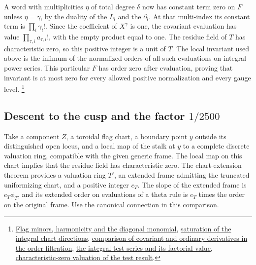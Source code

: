 A word with multiplicities \(\eta\) of total degree \(\delta\) now
has constant term zero on \(F\) unless \(\eta=\gamma\), by the
duality of the \(L_l\) and the \(\partial_l\). At that multi-index
its constant term is \(\prod_l\gamma_l!\). Since the coefficient
of \(X^\gamma\) is one, the covariant evaluation has value
\(\prod_{\tau,i}a_{\tau,i}!\), with the empty product equal to one.
The residue field of \(T\) has characteristic zero, so this positive
integer is a unit of \(T\). The local invariant used above is the
infimum of the normalized orders of all such evaluations on
integral power series. This particular \(F\) has order zero
after evaluation, proving that invariant is at most zero for
every allowed positive normalization and every gauge level.
\footnote{\href{https://github.com/ChristianKudeba/alpoge-rh-verification/blob/alpoge-source-7cbf7a0c/src/Formalism/LocalToGlobal/ProjectiveLattices/CrudeMin.lean}{Flag minors, harmonicity and the diagonal monomial},
\href{https://github.com/ChristianKudeba/alpoge-rh-verification/blob/alpoge-source-7cbf7a0c/src/Formalism/LocalToGlobal/ProjectiveLattices/SatLeaves.lean}{saturation of the integral chart directions},
\href{https://github.com/ChristianKudeba/alpoge-rh-verification/blob/alpoge-source-7cbf7a0c/src/Formalism/LocalToGlobal/ProjectiveLattices/CrudeOrd.lean}{comparison of covariant and ordinary derivatives in the order filtration},
\href{https://github.com/ChristianKudeba/alpoge-rh-verification/blob/alpoge-source-7cbf7a0c/src/Formalism/LocalToGlobal/ProjectiveLattices/ConjNeSelfOfCM.lean}{the integral test series and its factorial value},
\href{https://github.com/ChristianKudeba/alpoge-rh-verification/blob/alpoge-source-7cbf7a0c/src/Development/AbelianVarietyTheory/Proofs/DivisorProofs/ExistsHarmonicPolyLocalInvariantNonposChar0.lean}{characteristic-zero valuation of the test result}.}

\subsection{Descent to the cusp and the factor \(1/2500\)}

Take a component \(Z\), a toroidal flag chart, a boundary point
\(y\) outside its distinguished open locus, and a local map of the
stalk at \(y\) to a complete discrete valuation ring, compatible
with the given generic frame. The local map on this chart implies
that the residue field has characteristic zero. The chart-extension
theorem provides a valuation ring \(T'\), an extended frame admitting
the truncated uniformizing chart, and a positive integer \(e_T\).
The slope of the extended frame is \(e_T\phi_T\), and its extended
order on evaluations of a theta rule is \(e_T\) times the order on
the original frame. Use the canonical connection in this comparison.


